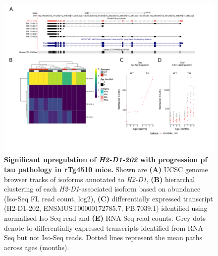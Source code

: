 \begin{landscape}
	\begin{figure}[!htp]
		\centering
		\includegraphics[page=2,trim={1.5cm 3.5cm 2cm 1cm}, scale = 0.85]{Figures/Ch5_DiffPlots_Landscape.pdf}
		\captionsetup{width=1.5\textwidth}
		\caption[Differential \textit{H2-D1} transcript expression]%
		{\textbf{Significant upregulation of \textit{H2-D1-202} with progression pf tau pathology in rTg4510 mice.} Shown are \textbf{(A)} UCSC genome browser tracks of isoforms annotated to \textit{H2-D1}, \textbf{(B)} hierarchal clustering of each \textit{H2-D1}-associated isoform based on abundance (Iso-Seq FL read count, log2), \textbf{(C)} differentially expressed transcript (H2-D1-202, ENSMUST00000172785.7, PB.7039.1) identified using normalised Iso-Seq read and \textbf{(E)} RNA-Seq read counts. Grey dots denote to differentially expressed transcripts identified from RNA-Seq but not Iso-Seq reads. Dotted lines represent the mean paths across ages (months).}   
		\label{fig:H2D1}
	\end{figure}	
\end{landscape}

